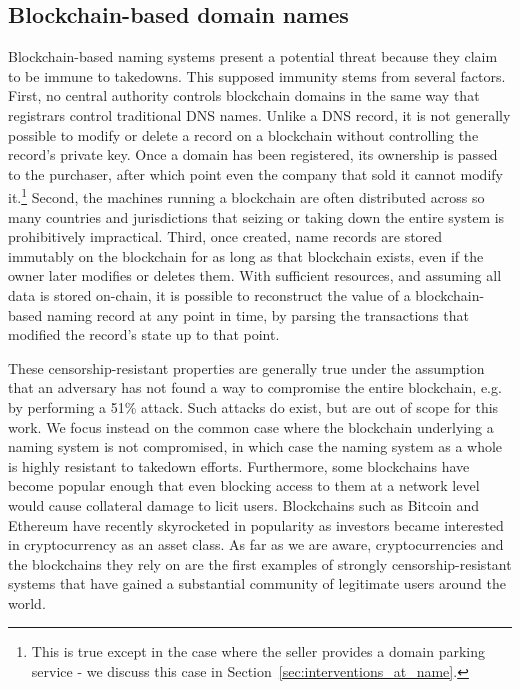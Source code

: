 \subsection{Blockchain-based domain names}

Blockchain-based naming systems present a potential threat 
because they claim to be immune to takedowns. This supposed immunity stems 
from several factors. 
First, no central authority 
controls blockchain domains in the same way that registrars 
control traditional DNS names. Unlike a DNS record, it is not generally 
possible 
to modify or delete a record on a blockchain without controlling the record's 
private key. Once a domain has been registered, its ownership is passed to the 
purchaser, after which 
point even the company that 
sold it cannot modify it.\footnote{This is true except in the case where the 
seller provides a domain parking service - we discuss this case in 	
Section~\ref{sec:interventions_at_name}.}
Second, the machines running a blockchain are often distributed across so many 
countries and jurisdictions that seizing or taking down the entire system is 
prohibitively impractical. 
Third, once created, name records are stored immutably on the 
blockchain for as long as that blockchain exists, even if the owner later 
modifies or deletes them. With sufficient resources, and assuming all data is 
stored on-chain, it is possible to reconstruct the value of a 
blockchain-based naming record at any point in time, by parsing the 
transactions that modified the record's state up to that point.

These censorship-resistant properties are generally true under the assumption 
that an adversary has not found a way to compromise the entire blockchain, e.g. 
by performing a 51\% attack. Such 
attacks do exist, but are out of scope for this work. We focus instead on the 
common case where the blockchain underlying a naming system is not compromised, 
in which case the naming system as a whole is highly resistant to takedown 
efforts. Furthermore, some blockchains have become popular enough that even 
blocking access to them at a network level would cause collateral damage to 
licit users. Blockchains such as Bitcoin and Ethereum have recently 
skyrocketed in popularity as investors became interested in cryptocurrency as 
an asset class. As far as we are aware, cryptocurrencies and the blockchains 
they rely on are the first examples of strongly censorship-resistant systems 
that have gained a substantial community of legitimate users around the world.

